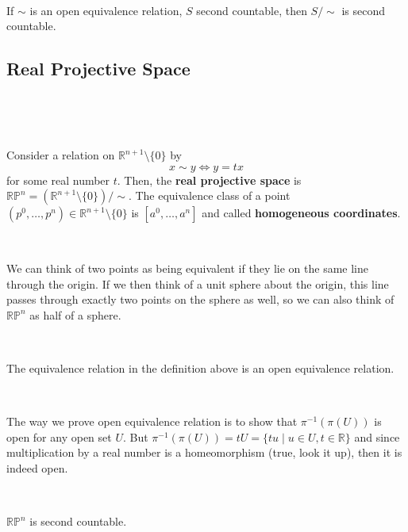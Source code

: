 \documentclass{article}
\begin{document}
\begin{corollary}
  \

  If $\sim$ is an open equivalence relation, $S$ second countable, then $S/\sim$ is second countable.
\end{corollary}

\subsection{Real Projective Space}
\

\begin{definition}
  \

  Consider a relation on $\mathbb{R}^{n+1} \setminus \{0\}$ by $$x \sim y \iff y = tx$$for some real number $t$. Then, the \textbf{real projective space} is $\mathbb{R} \mathbb{P}^n = (\mathbb{R}^{n+1}\setminus \{0\})/\sim$. The equivalence class of a point $(p^0, \dots, p^n) \in \mathbb{R}^{n+1} \setminus \{0\}$ is $[a^0, \dots, a^n]$ and called \textbf{homogeneous coordinates}.
\end{definition}

\begin{remark}
  \

  We can think of two points as being equivalent if they lie on the same line through the origin. If we then think of a unit sphere about the origin, this line passes through exactly two points on the sphere as well, so we can also think of $\mathbb{R} \mathbb{P}^n$ as half of a sphere.
\end{remark}

\begin{proposition}
  \

  The equivalence relation in the definition above is an open equivalence relation.
\end{proposition}

\begin{customproof}
  \

  The way we prove open equivalence relation is to show that $\pi ^{-1}(\pi(U))$ is open for any open set $U$. But $\pi ^{-1}(\pi(U)) = tU = \{tu \mid u \in U, t \in \mathbb{R}\}$ and since multiplication by a real number is a homeomorphism (true, look it up), then it is indeed open.
\end{customproof}

\begin{proposition}
  \

  $\mathbb{RP}^n$ is second countable.
\end{proposition}
\end{document}
